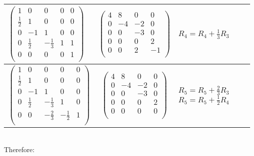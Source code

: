 \documentclass{article}
\begin{document}
\begin{tabular}{|l|c|p{5cm}|}
\hline
$\begin{pmatrix}
    1 & 0 & 0 & 0 & 0\\
    \frac{1}{2} & 1 & 0 & 0  & 0\\
    0 & -1 & 1 & 0 & 0\\
    0 & \frac{1}{2} & -\frac{1}{3} & 1 & 1\\
    0 & 0 & 0 & 0 & 1\\
\end{pmatrix}$
&
$\begin{pmatrix}
    4 & 8 & 0 & 0 \\
    0 & -4 & -2 & 0 \\
    0 & 0 & -3 & 0 \\
    0 & 0 & 0 & 2 \\
    0 & 0 & 2 & -1 \\
\end{pmatrix}$
&
$R_4 = R_4 + \frac{1}{3} R_3$\\
\hline
$\begin{pmatrix}
    1 & 0 & 0 & 0 & 0\\
    \frac{1}{2} & 1 & 0 & 0 & 0 \\
    0 & -1 & 1 & 0 & 0\\
    0 & \frac{1}{2} & -\frac{1}{3} & 1 & 0\\
    0 & 0 & -\frac{2}{3} & -\frac{1}{2} & 1\\
\end{pmatrix}$
&
$\begin{pmatrix}
    4 & 8 & 0 & 0 \\
    0 & -4 & -2 & 0 \\
    0 & 0 & -3 & 0 \\
    0 & 0 & 0 & 2 \\
    0 & 0 & 0 & 0 \\
\end{pmatrix}$
&
$R_5 = R_5 + \frac{2}{3}R_3$ \newline
$R_5 = R_5 + \frac{1}{2}R_4$\\
\hline
\end{tabular} \\
Therefore: \\
\end{document}
